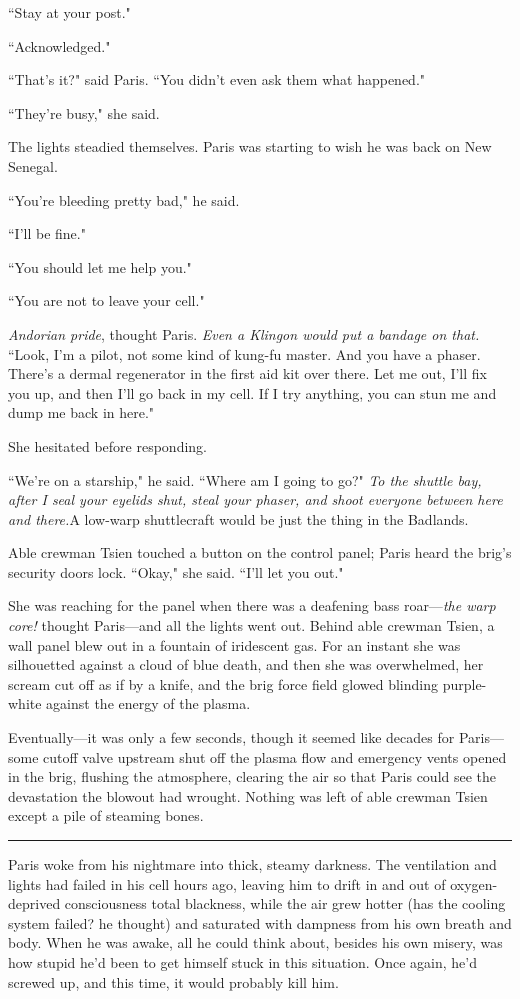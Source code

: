 \documentclass[twoside,letterpaper,12pt]{memoir}
\begin{document}
``Stay at your post."

``Acknowledged."

``That's it?" said Paris. ``You didn't even ask them what happened."

``They're busy," she said.

The lights steadied themselves. Paris was starting to wish he was back on New Senegal.

``You're bleeding pretty bad," he said.

``I'll be fine."

``You should let me help you."

``You are not to leave your cell."

\textit{Andorian pride}, thought Paris. \textit{Even a Klingon would put a bandage on that.} ``Look, I'm a pilot, not some kind of kung-fu master. And you have a phaser. There's a dermal regenerator in the first aid kit over there. Let me out, I'll fix you up, and then I'll go back in my cell. If I try anything, you can stun me and dump me back in here."

She hesitated before responding.

``We're on a starship," he said. ``Where am I going to go?" \textit{To the shuttle bay, after I seal your eyelids shut, steal your phaser, and shoot everyone between here and there.}A low-warp shuttlecraft would be just the thing in the Badlands.

Able crewman Tsien touched a button on the control panel; Paris heard the brig's security doors lock. ``Okay," she said. ``I'll let you out."

She was reaching for the panel when there was a deafening bass roar---\textit{the warp core!} thought Paris---and all the lights went out. Behind able crewman Tsien, a wall panel blew out in a fountain of iridescent gas. For an instant she was silhouetted against a cloud of blue death, and then she was overwhelmed, her scream cut off as if by a knife, and the brig force field glowed blinding purple-white against the energy of the plasma.

Eventually---it was only a few seconds, though it seemed like decades for Paris---some cutoff valve upstream shut off the plasma flow and emergency vents opened in the brig, flushing the atmosphere, clearing the air so that Paris could see the devastation the blowout had wrought. Nothing was left of able crewman Tsien except a pile of steaming bones.

\fancybreak{\rule{3cm}{0.4 pt}}
Paris woke from his nightmare into thick, steamy darkness. The ventilation and lights had failed in his cell hours ago, leaving him to drift in and out of oxygen-deprived consciousness total blackness, while the air grew hotter (has the cooling system failed? he thought) and saturated with dampness from his own breath and body. When he was awake, all he could think about, besides his own misery, was how stupid he'd been to get himself stuck in this situation. Once again, he'd screwed up, and this time, it would probably kill him.
\end{document}

